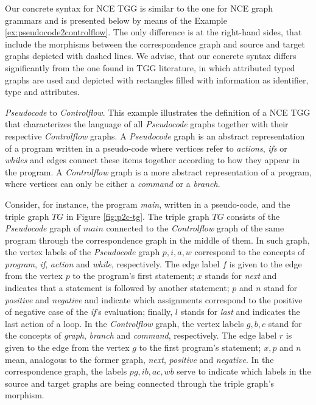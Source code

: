 Our concrete syntax for NCE TGG is similar to the one for NCE graph grammars and is presented below by means of the Example \ref{ex:pseudocode2controlflow}. The only difference is at the right-hand sides, that include the morphisms between the correspondence graph and source and target graphs depicted with dashed lines. We advise, that our concrete syntax differs significantly from the one found in TGG literature, in which attributed typed graphs are used and depicted with rectangles filled with information as identifier, type and attributes.

\begin{example}{\emph{Pseudocode} to \emph{Controlflow}.}
	\label{ex:pseudocode2controlflow}
	This example illustrates the definition of a NCE TGG that characterizes the language of all \emph{Pseudocode} graphs together with their respective \emph{Controlflow} graphs. A \emph{Pseudocode} graph is an abstract representation of a program written in a pseudo-code where vertices refer to \emph{actions}, \emph{ifs} or \emph{whiles} and edges connect these items together according to how they appear in the program. A \emph{Controlflow} graph is a more abstract representation of a program, where vertices can only be either a \emph{command} or a \emph{branch}.
	
	Consider, for instance, the program \emph{main}, written in a pseudo-code, and the triple graph $TG$ in Figure \ref{fig:p2c-tg}. The triple graph $TG$ consists of the \emph{Pseudocode} graph of $main$ connected to the \emph{Controlflow} graph of the same program through the correspondence graph in the middle of them. In such graph, the vertex labels of the \emph{Pseudocode} graph $p, i, a, w$ correspond to the concepts of \emph{program}, \emph{if}, \emph{action} and \emph{while}, respectively. The edge label $f$ is given to the edge from the vertex $p$ to the program's first statement; $x$ stands for \emph{next} and indicates that a statement is followed by another statement; $p$ and $n$ stand for \emph{positive} and \emph{negative} and indicate which assignments correspond to the positive of negative case of the \emph{if}'s evaluation; finally, $l$ stands for \emph{last} and indicates the last action of a loop. In the \emph{Controlflow} graph, the vertex labels $g, b, c$ stand for the concepts of \emph{graph}, \emph{branch} and \emph{command}, respectively. The edge label $r$ is given to the edge from the vertex $g$ to the first program's statement; $x, p$ and $n$ mean, analogous to the former graph, \emph{next}, \emph{positive} and \emph{negative}. In the correspondence graph, the labels $pg, ib, ac, wb$ serve to indicate which labels in the source and target graphs are being connected through the triple graph's morphism.
	
	

\end{example}
